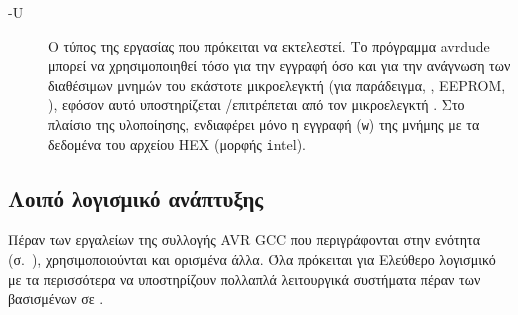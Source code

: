 \begin{enumerate}
\begin{description}
        \item[-U] Ο τύπος της εργασίας που πρόκειται να εκτελεστεί. Το πρόγραμμα
        avrdude μπορεί να χρησιμοποιηθεί τόσο για την εγγραφή όσο και για την
        ανάγνωση των διαθέσιμων μνημών του εκάστοτε μικροελεγκτή (για
        παράδειγμα, , EEPROM, ), εφόσον αυτό υποστηρίζεται%
        \slash{}επιτρέπεται από τον μικροελεγκτή \parencite{avrdude}. Στο
        πλαίσιο της υλοποίησης, ενδιαφέρει μόνο η εγγραφή (\verb~w~) της μνήμης
         με τα δεδομένα του αρχείου HEX (μορφής \verb~i~ntel).
    \end{description}

\end{enumerate}


\subsection{Λοιπό λογισμικό ανάπτυξης} %

Πέραν των εργαλείων της συλλογής AVR GCC που περιγράφονται στην ενότητα
 (σ.~\pageref{subsubsec:avr:toolchain}),
χρησιμοποιούνται και ορισμένα άλλα. Όλα πρόκειται για Ελεύθερο λογισμικό με τα
περισσότερα να υποστηρίζουν πολλαπλά λειτουργικά συστήματα πέραν των βασισμένων
σε .


